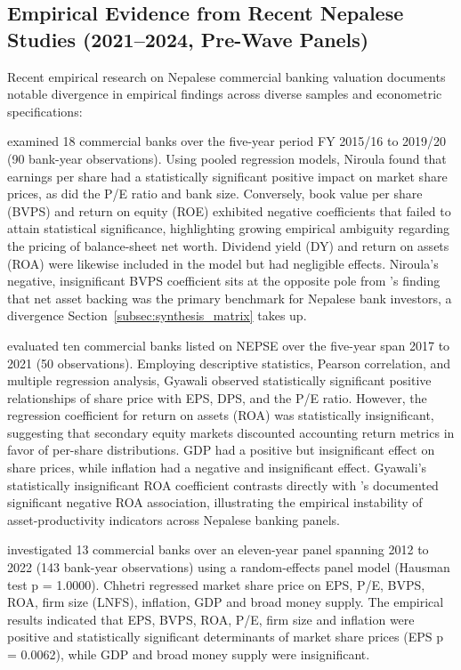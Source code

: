 \subsection{Empirical Evidence from Recent Nepalese Studies (2021--2024, Pre-Wave Panels)}
\label{subsec:recent_nepal}

Recent empirical research on Nepalese commercial banking valuation documents notable divergence in empirical findings across diverse samples and econometric specifications:

\citet{niroula2021} examined 18 commercial banks over the five-year period FY 2015/16 to 2019/20 (90 bank-year observations). Using pooled regression models, Niroula found that earnings per share had a statistically significant positive impact on market share prices, as did the P/E ratio and bank size. Conversely, book value per share (BVPS) and return on equity (ROE) exhibited negative coefficients that failed to attain statistical significance, highlighting growing empirical ambiguity regarding the pricing of balance-sheet net worth. Dividend yield (DY) and return on assets (ROA) were likewise included in the model but had negligible effects. Niroula's negative, insignificant BVPS coefficient sits at the opposite pole from \citet{silwal2019}'s finding that net asset backing was the primary benchmark for Nepalese bank investors, a divergence Section~\ref{subsec:synthesis_matrix} takes up.

\citet{gyawali2022} evaluated ten commercial banks listed on NEPSE over the five-year span 2017 to 2021 (50 observations). Employing descriptive statistics, Pearson correlation, and multiple regression analysis, Gyawali observed statistically significant positive relationships of share price with EPS, DPS, and the P/E ratio. However, the regression coefficient for return on assets (ROA) was statistically insignificant, suggesting that secondary equity markets discounted accounting return metrics in favor of per-share distributions. GDP had a positive but insignificant effect on share prices, while inflation had a negative and insignificant effect. Gyawali's statistically insignificant ROA coefficient contrasts directly with \citet{chaudhari2025}'s documented significant negative ROA association, illustrating the empirical instability of asset-productivity indicators across Nepalese banking panels.

\citet{chhetri2023} investigated 13 commercial banks over an eleven-year panel spanning 2012 to 2022 (143 bank-year observations) using a random-effects panel model (Hausman test p = 1.0000). Chhetri regressed market share price on EPS, P/E, BVPS, ROA, firm size (LNFS), inflation, GDP and broad money supply. The empirical results indicated that EPS, BVPS, ROA, P/E, firm size and inflation were positive and statistically significant determinants of market share prices (EPS p = 0.0062), while GDP and broad money supply were insignificant.

